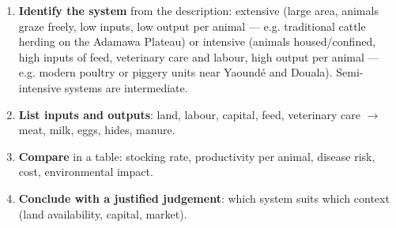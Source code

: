 \documentclass[11pt]{article}
\newcommand{\cle}[1]{{\popxbold\color{popdark}#1}}
\begin{document}
\begin{methode}
\begin{enumerate}
\item \textbf{Identify the system} from the description: \cle{extensive} (large area, animals graze freely, low inputs, low output per animal — e.g. traditional cattle herding on the Adamawa Plateau) or \cle{intensive} (animals housed/confined, high inputs of feed, veterinary care and labour, high output per animal — e.g. modern poultry or piggery units near Yaoundé and Douala). \cle{Semi-intensive} systems are intermediate.
\item \textbf{List inputs and outputs}: land, labour, capital, feed, veterinary care $\rightarrow$ meat, milk, eggs, hides, manure.
\item \textbf{Compare} in a table: stocking rate, productivity per animal, disease risk, cost, environmental impact.
\item \textbf{Conclude with a justified judgement}: which system suits which context (land availability, capital, market).
\end{enumerate}
\end{methode}
\end{document}
